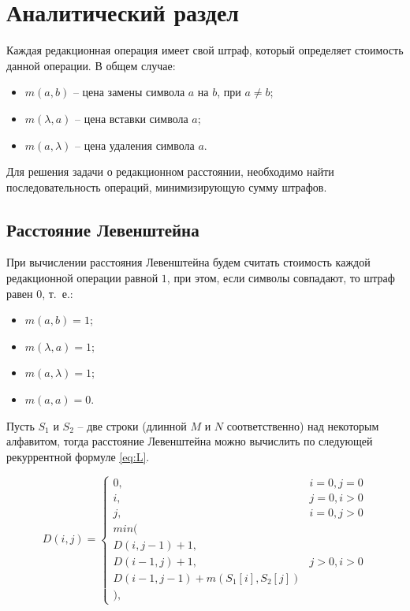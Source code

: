 \chapter{Аналитический раздел}

Каждая редакционная операция имеет свой штраф, который определяет стоимость данной операции. В общем случае:
\begin{itemize}
	\item $ m(a, b) $ -- цена замены символа $ a $ на $ b $, при $ a \ne b $;
	\item $ m(\lambda, a) $ -- цена вставки символа $ a $;
	\item $ m(a, \lambda) $ -- цена удаления символа $ a $.
\end{itemize}

Для решения задачи о редакционном расстоянии, необходимо найти последовательность операций, минимизирующую сумму штрафов. 

\section{Расстояние Левенштейна}

При вычислении расстояния Левенштейна будем считать стоимость каждой редакционной операции равной $ 1 $, при этом, если символы совпадают, то штраф равен $0$, т.~е.:
\begin{itemize}
	\item $ m(a, b) = 1 $;
	\item $ m(\lambda, a) = 1 $;
	\item $ m(a, \lambda) = 1 $;
	\item $ m(a, a) = 0 $.
\end{itemize}

Пусть $S_1$ и $S_2$ -- две строки (длинной $M$ и $N$ соответственно) над некоторым алфавитом, тогда расстояние Левенштейна можно вычислить по следующей рекуррентной формуле \eqref{eq:L}.

\begin{equation}
	\label{eq:L}
	D(i,j) = \left\{ \begin{array}{ll}
		0, & \textrm{$i = 0, j = 0$}\\
		i, & \textrm{$j = 0, i > 0$}\\
		j, & \textrm{$i = 0, j > 0$}\\
		min(\\
		D(i,j-1)+1,\\
		D(i-1, j) +1, &\textrm{$j>0, i>0$}\\
		D(i-1, j-1) + m(S_{1}[i], S_{2}[j])\\
		),
	\end{array} \right.
\end{equation}

